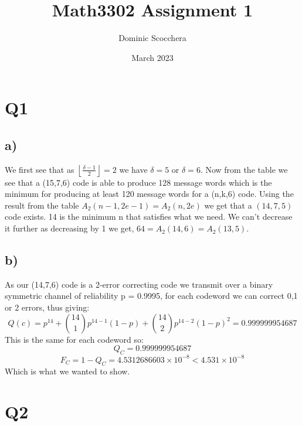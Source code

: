 \documentclass{article}
\title{Math3302 Assignment 1}
\author{Dominic Scocchera}
\date{March 2023}
\begin{document}
\maketitle
\section*{Q1}
\subsection*{a)}
We first see that as $\left\lfloor\frac{\delta-1}{2}\right\rfloor=2$ we have $\delta=5$ or $\delta=6$. Now from the table we see that a (15,7,6) code is able to produce 128 message words which is the minimum for producing at least 120 message words for a (n,k,6) code. Using the result from the table $A_2(n-1,2e-1)=A_2(n,2e)$ we get that a $(14,7,5)$ code exists. 14 is the minimum n that satisfies what we need. We can't decrease it further as decreasing by 1 we get, $64=A_2(14,6)=A_2(13,5)$.
\subsection*{b)}
As our (14,7,6) code is a 2-error correcting code we transmit over a binary symmetric channel of reliability p = 0.9995, for each codeword we can correct 0,1 or 2 errors, thus giving:
$$Q(c)=p^{14}+{14 \choose 1}p^{14-1}(1-p)+{14 \choose 2}p^{14-2}(1-p)^2=0.999999954687$$
This is the same for each codeword so:
$$Q_C=0.999999954687$$
$$F_C=1-Q_C=4.5312686603\times10^{-8}<4.531\times10^{-8}$$
Which is what we wanted to show.
\section*{Q2}
\end{document}

